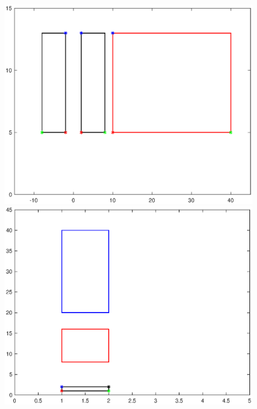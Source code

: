 \documentclass[10pt]{article}
\begin{document}
\begin{enumerate}[leftmargin=\labelsep]
    \begin{figure}[h]
        \begin{minipage}[c]{0.48\linewidth}
        \includegraphics[width=\linewidth]{Figure1.eps}
        \caption{}
        \end{minipage}
        \hfill
        \begin{minipage}[c]{0.48\linewidth}
        \includegraphics[width=\linewidth]{Figure2.eps}
        \caption{}
        \end{minipage}%
    \end{figure}
    

\end{enumerate}
\end{document}
